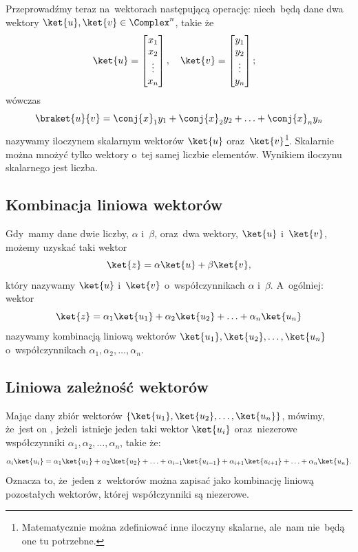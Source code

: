 Przeprowadźmy teraz na~wektorach następującą operację:
niech~będą dane dwa wektory $\ket{u}, \ket{v}\in \Complex^n$, takie że
$$
	\ket{u} =
	\begin{bmatrix}
		x_1    \\
		x_2    \\
		\vdots \\
		x_{n}  \\
	\end{bmatrix},\quad
	\ket{v} =
	\begin{bmatrix}
		y_1    \\
		y_2    \\
		\vdots \\
		y_{n}  \\
	\end{bmatrix};\quad
$$
wówczas
$$
	\braket{u}{v} = \conj{x}_1 y_1 + \conj{x}_2 y_2 + \ldots + \conj{x}_n y_n
$$
nazywamy iloczynem skalarnym wektorów $\ket{u}$ oraz~$\ket{v}$\footnote{Matematycznie
	można zdefiniować inne iloczyny skalarne,
	ale~nam nie~będą one tu potrzebne.}. Skalarnie można mnożyć tylko wektory o~tej
samej liczbie elementów. Wynikiem iloczynu skalarnego jest liczba.

\subsection{Kombinacja liniowa wektorów}
Gdy~mamy dane dwie liczby, $\alpha$ i~$\beta$, oraz~dwa wektory, $\ket{u}$ i~$\ket{v}$,
możemy uzyskać taki wektor
$$
	\ket{z} = \alpha \ket{u} + \beta \ket{v},
$$
który nazywamy 
$\ket{u}$ i~$\ket{v}$ o~współczynnikach $\alpha$ i~$\beta$.
A~ogólniej: wektor
$$
	\ket{z} = \alpha_1 \ket{u_1} + \alpha_2 \ket{u_2} + \ldots + \alpha_n \ket{u_n}
$$
nazywamy kombinacją liniową wektorów $\ket{u_1}, \ket{u_2}, \ldots, \ket{u_n}$
o~współczynnikach $\alpha_1, \alpha_2, \ldots, \alpha_n$.

\subsection{Liniowa zależność wektorów}
Mając dany zbiór wektorów $\{\ket{u_1}, \ket{u_2}, \ldots, \ket{u_n}\}$, mówimy,
że~jest on , jeżeli~istnieje
jeden taki wektor $\ket{u_i}$ oraz~niezerowe współczynniki $\alpha_1,
	\alpha_2, \ldots, \alpha_n$, takie że:
$$
	\alpha_i \ket{u_i} = \alpha_1 \ket{u_1} + \alpha_2 \ket{u_2} +
	\ldots + \alpha_{i-1} \ket{u_{i-1}} + \alpha_{i+1} \ket{u_{i+1}} + \ldots + \alpha_n \ket{u_n}.
$$
Oznacza to, że~jeden z~wektorów można zapisać jako kombinację liniową pozostałych wektorów, której współczynniki są niezerowe.

